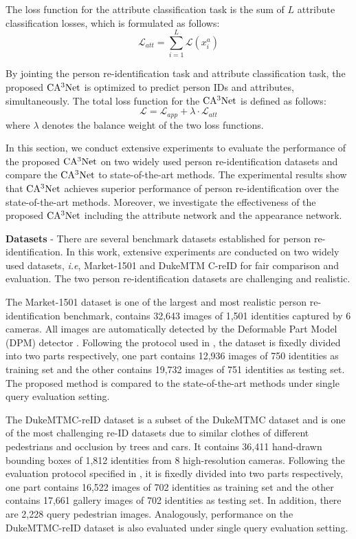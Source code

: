 \documentclass[sigconf]{acmart}
\begin{document}
The loss function for the attribute classification task is the sum of $L$ attribute classification losses, which is formulated as follows:
\begin{equation}
\mathcal{L}_{att}=\sum\limits_{i=1}^{L}\mathcal{L}(x_i^a)
\end{equation}

By jointing the person re-identification task and attribute classification task, the proposed $\rm CA^3Net$ is optimized to predict person IDs and attributes, simultaneously. The total loss function for the $\rm CA^3Net$ is defined as follows:
\begin{equation}
\mathcal{L} = \mathcal{L}_{app} + \lambda\cdot \mathcal{L}_{att}
\end{equation}
where $\lambda$ denotes the balance weight of the two loss functions.

In this section, we conduct extensive experiments to evaluate the performance of the proposed $\rm CA^3Net$ on two widely used person re-identification datasets and compare the $\rm CA^3Net$ to state-of-the-art methods. The experimental results show that $\rm CA^3Net$ achieves superior performance of person re-identification over the state-of-the-art methods. Moreover, we investigate the effectiveness of the proposed $\rm CA^3Net$ including the attribute network and the appearance network.

\textbf{Datasets} - There are several benchmark datasets established for person re-identification. In this work, extensive experiments are conducted on two widely used datasets, \textit{i.e}, Market-1501 and DukeMTM
C-reID for fair comparison and evaluation. The two person re-identification datasets are challenging and realistic.

The Market-1501 dataset is one of the largest and most realistic person re-identification benchmark, contains 32,643 images of 1,501 identities captured by 6 cameras. All images are automatically detected by the Deformable Part Model (DPM) detector \cite{15}. Following the protocol used in \cite{17}, the dataset is fixedly divided into two parts respectively, one part contains 12,936 images of 750 identities as training set and the other contains 19,732 images of 751 identities as testing set. The proposed method is compared to the state-of-the-art methods under single query evaluation setting.

The DukeMTMC-reID dataset is a subset of the DukeMTMC dataset \cite{19} and is one of the most challenging re-ID datasets due to similar clothes of different pedestrians and occlusion by trees and cars. It contains 36,411 hand-drawn bounding boxes of 1,812 identities from 8 high-resolution cameras. Following the evaluation protocol specified in \cite{18}, it is fixedly divided into two parts respectively, one part contains 16,522 images of 702 identities as training set and the other contains 17,661 gallery images of 702 identities as testing set. In addition, there are 2,228 query pedestrian images. Analogously, performance on the DukeMTMC-reID dataset is also evaluated under single query evaluation setting.
\end{document}
